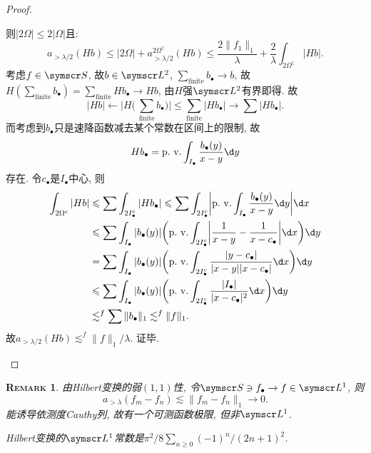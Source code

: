 \documentclass{ctexart}
\makeatletter
\newcommand\<{\@ifstar\@angle@star\@angle@nostar}
\newtheorem*{remark}{{\scshape Remark}}
\def\pv{\mathop{\textup{p.\ v.}}}
\makeatother
\begin{document}
\begin{proof}
\begin{itemize}
              则$|2\Omega |\leqslant 2|\Omega |$且:
              \[a_{>\lambda /2}(Hb)\leqslant |2\Omega |+a^{2\Omega ^\complement}_{>\lambda /2}(Hb)\leqslant \frac{2\|f_1\|_1}{\lambda } + \frac{2}{\lambda }\int_{2\Omega ^\complement}|Hb|.\]
              考虑$f\in\symscr S$, 故$b\in\symscr L^2$, $\sum_{\text{finite}}b_\bullet\to b$, 故$H(\sum_{\text{finite}}b_\bullet)=\sum_{\text{finite}}Hb_\bullet\to Hb$, 由$H$强$\symscr L^2$有界即得. 故
              \[|Hb|\leftarrow \biggl|H\biggl(\,\sum_{\text{finite}}b_\bullet\biggr)\biggr|\leqslant \sum_{\text{finite}}|Hb_\bullet|\to \sum|Hb_\bullet|.\]
              而考虑到$b_\bullet$只是速降函数减去某个常数在区间上的限制, 故
              \[Hb_\bullet=\pv\int_{I_\bullet} \frac{b_\bullet(y)}{x-y}\d y\]
              存在. 令$c_\bullet$是$I_\bullet$中心, 则
              \[
                  \begin{aligned}
                      \int_{2\Omega ^\complement}|Hb|
                       & \leqslant \sum\int_{2I_\bullet^\complement}|Hb_\bullet| \leqslant \sum\int_{2I_\bullet^\complement}\biggl|\pv\int_{I_\bullet} \frac{b_\bullet(y)}{x-y}\d y\biggr|\d x \\
                       & \leqslant \sum\int_{I_\bullet}|b_\bullet(y)|\biggl(\pv\int_{2I_\bullet^\complement} \biggl|\frac{1}{x-y}-\frac{1}{x-c_\bullet}\biggr|\d x\biggr)\d y                  \\
                       & =         \sum\int_{I_\bullet}|b_\bullet(y)|\biggl(\pv\int_{2I_\bullet^\complement} \frac{|y-c_\bullet|}{|x-y||x-c_\bullet|}\d x\biggr)\d y                           \\
                       & \leqslant \sum\int_{I_\bullet}|b_\bullet(y)|\biggl(\pv\int_{2I_\bullet^\complement} \frac{|I_\bullet|}{|x-c_\bullet|^2}\d x\biggr)\d y                                \\
                       & \lesssim^f \sum\|b_\bullet\|_1\lesssim^f \|f\|_1.
                  \end{aligned}
              \]
              故$a_{>\lambda /2}(Hb)\lesssim^f \|f\|_1 /\lambda $. 证毕. \qedhere
    \end{itemize}
\end{proof}
\begin{remark}
    由Hilbert变换的弱$(1,1)$性, 令$\symscr S\ni f_\bullet\to f\in\symscr L^1$, 则
    \[a_{>\lambda }(f_m-f_n)\lesssim \|f_m-f_n\|_1\to 0.\]
    能诱导依测度Cauthy列, 故有一个可测函数极限, 但非$\symscr L^1$.

    Hilbert变换的$\symscr L^1$常数是$\pi ^2/8\sum_{n\geqslant 0}(-1)^n / (2n+1)^2$.
\end{remark}
\end{document}
